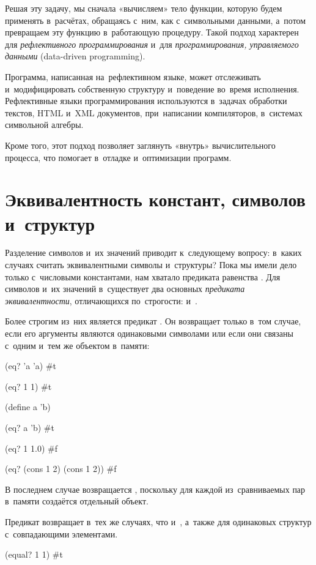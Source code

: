 Решая эту задачу, мы сначала «вычисляем» тело функции, которую будем применять в~расчётах, обращаясь с~ним, как с~символьными данными, а~потом превращаем эту функцию в~работающую процедуру. Такой подход характерен для \emph{рефлективного программирования} и~для \emph{программирования, управляемого данными} (data-driven programming).

Программа, написанная на~рефлективном языке, может отслеживать и~модифицировать собственную структуру и~поведение во~время исполнения. Рефлективные языки программирования используются в~задачах обработки текстов, HTML и~XML документов, при~написании компиляторов, в~системах символьной алгебры.

Кроме того, этот подход позволяет заглянуть «внутрь» вычислительного процесса, что помогает в~отладке и~оптимизации программ.

\section[4]{Эквивалентность констант, символов и~структур}%
Разделение символов и~их значений приводит к~следующему вопросу: в~каких случаях считать эквивалентными символы и~структуры? Пока мы имели дело только с~числовыми константами, нам хватало предиката равенства \s{=}. Для символов и~их значений в~\Scheme существует два основных \emph{предиката эквивалентности}, отличающихся по~строгости:  и~.

Более строгим из~них является предикат . Он возвращает  только в~том случае, если его аргументы являются одинаковыми символами или если они связаны с~одним и~тем же объектом в~памяти:

\REPL
  {(eq? 'a 'a)}
  {\#t}

\REPL
  {(eq? 1 1)}
  {\#t}

\REPLin
  {(define a 'b)}

\REPL
  {(eq? a 'b)}
  {\#t}

\REPL
  {(eq? 1 1.0)}
  {\#f}

\REPL
  {(eq? (cons 1 2) (cons 1 2))}
  {\#f}

В последнем случае возвращается , поскольку для каждой из~сравниваемых пар в~памяти создаётся отдельный объект.

Предикат  возвращает  в~тех же случаях, что и~, а~также для одинаковых структур с~совпадающими элементами.

\REPL
  {(equal? 1 1)}
  {\#t}

